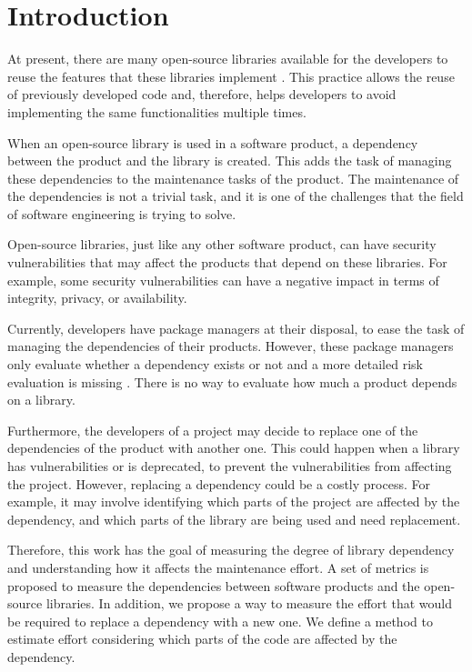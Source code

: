 \documentclass[a4paper]{article}
\begin{document}
\section{Introduction}

At present, there are many open-source libraries available for the developers to reuse the features that these libraries implement \cite{kikas2017structure}. This practice allows the reuse of previously developed code and, therefore, helps developers to avoid implementing the same functionalities multiple times.

When an open-source library is used in a software product, a dependency between the product and the library is created. This adds the task of managing these dependencies to the maintenance tasks of the product. The maintenance of the dependencies is not a trivial task, and it is one of the challenges that the field of software engineering is trying to solve.

Open-source libraries, just like any other software product, can have security vulnerabilities that may affect the products that depend on these libraries. For example, some security vulnerabilities can have a negative impact in terms of integrity, privacy, or availability.

Currently, developers have package managers at their disposal, to ease the task of managing the dependencies of their products. However, these package managers only evaluate whether a dependency exists or not and a more detailed risk evaluation is missing \cite{hejderup2018prazi}. There is no way to evaluate how much a product depends on a library.

Furthermore, the developers of a project may decide to replace one of the dependencies of the product with another one. This could happen when a library has vulnerabilities or is deprecated, to prevent the vulnerabilities from affecting the project. However, replacing a dependency could be a costly process. For example, it may involve identifying which parts of the project are affected by the dependency, and which parts of the library are being used and need replacement.

Therefore, this work has the goal of measuring the degree of library dependency and understanding how it affects the maintenance effort. A set of metrics is proposed to measure the dependencies between software products and the open-source libraries. In addition, we propose a way to measure the effort that would be required to replace a dependency with a new one. We define a method to estimate effort considering which parts of the code are affected by the dependency.
\end{document}
